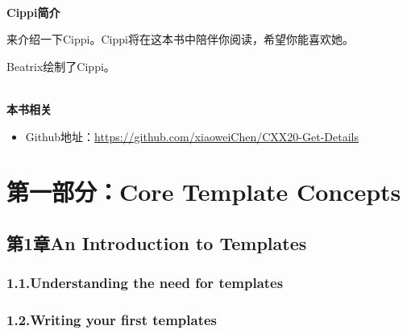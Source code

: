 \documentclass[11pt,a4paper,UTF8]{book}
\begin{document}
\begin{sloppypar}
		\hspace*{\fill} \\ %
		\noindent\textbf{Cippi简介}
		
		来介绍一下Cippi。Cippi将在这本书中陪伴你阅读，希望你能喜欢她。
		
		Beatrix绘制了Cippi。
		
		\hspace*{\fill} \\ %
		\noindent\textbf{本书相关}
		\begin{itemize}
			\item Github地址：\url{https://github.com/xiaoweiChen/CXX20-Get-Details}
		\end{itemize}
		\newpage
		
		\pagestyle{empty}
		
		\newpage
		
		\tableofcontents
		\newpage
		
		
		\color{white}
		\section*{第一部分：Core Template Concepts}
		\pagecolor{mygray}
		\textbf{}
		\newpage
		\color{black}
		\pagecolor{white}
		
		\subsection*{ 第1章\hspace{0.5cm}An Introduction to Templates}
		
		
		\subsubsection*{ 1.1.\hspace{0.2cm}Understanding the need for templates}
		
		
		\subsubsection*{ 1.2.\hspace{0.2cm}Writing your first templates}
		
		

\end{sloppypar}
\end{document}

